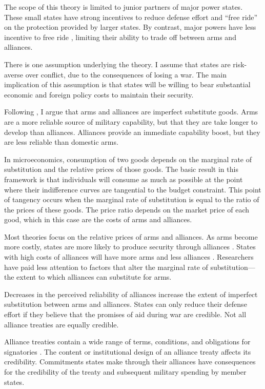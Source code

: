 \documentclass[12pt]{article}
\begin{document}
The scope of this theory is limited to junior partners of major power states. These small states have strong incentives to reduce defense effort and ``free ride'' on the protection provided by larger states. By contrast, major powers have less incentive to free ride \citep{OlsonZeckhauser1966}, limiting their ability to trade off between arms and alliances. 

There is one assumption underlying the theory. I assume that states are risk-averse over conflict, due to the consequences of losing a war. The main implication of this assumption is that states will be willing to bear substantial economic and foreign policy costs to maintain their security. 

Following \citet{Morrow1993}, I argue that arms and alliances are imperfect substitute goods. Arms are a more reliable source of military capability, but that they are take longer to develop than alliances. Alliances provide an immediate capability boost, but they are less reliable than domestic arms. 

In microeconomics, consumption of two goods depends on the marginal rate of substitution and the relative prices of those goods. The basic result in this framework is that individuals will consume as much as possible at the point where their indifference curves are tangential to the budget constraint. This point of tangency occurs when the marginal rate of substitution is equal to the ratio of the prices of these goods. The price ratio depends on the market price of each good, which in this case are the costs of arms and alliances. 

Most theories focus on the relative prices of arms and alliances. As arms become more costly, states are more likely to produce security through alliances \citep{AllenDigiuseppe2013, Kimball2010}. States with high costs of alliances will have more arms and less alliances \citep{Sorokin1994}. Researchers have paid less attention to factors that alter the marginal rate of substitution--- the extent to which alliances can substitute for arms. 

Decreases in the perceived reliability of alliances increase the extent of imperfect substitution between arms and alliances. States can only reduce their defense effort if they believe that the promises of aid during war are credible. Not all alliance treaties are equally credible. 

Alliance treaties contain a wide range of terms, conditions, and obligations for signatories \citep{Benson2011, Chibaetal2015}. The content or institutional design of an alliance treaty affects its credibility. Commitments states make through their alliances have consequences for the credibility of the treaty and subsequent military spending by member states. 
\end{document}
